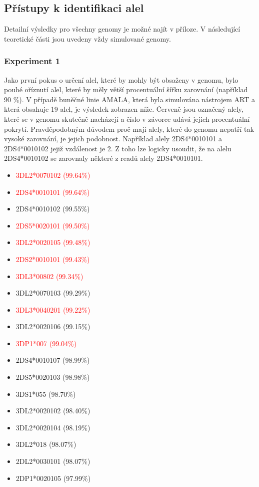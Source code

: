 \documentclass[czech,DP]{thesiskiv}
\numberwithin{equation}{section}
\begin{document}
\subsection{Přístupy k identifikaci alel}
Detailní výsledky pro všechny genomy je možné najít v příloze. V následující teoretické části jsou uvedeny vždy simulované genomy.

\subsubsection{Experiment 1}
Jako první pokus o určení alel, které by mohly být obsaženy v genomu, bylo pouhé oříznutí alel, které by měly větší procentuální šířku zarovnání (například 90 \%).  V případě buněčné linie AMALA, která byla simulována nástrojem ART a která obsahuje 19 alel, je výsledek zobrazen níže. Červeně jsou označený alely, které se v genomu skutečně nacházejí a číslo v závorce udává jejich procentuální pokrytí. Pravděpodobným důvodem proč mají alely, které do genomu nepatří tak vysoké zarovnání, je jejich podobnost. Například alely 2DS4*0010101 a 2DS4*0010102 jejiž vzdálenost je 2. Z toho lze logicky usoudit, že na alelu 2DS4*0010102 se zarovnaly některé z readů alely 2DS4*0010101.

\begin{multicols}{2}
\begin{itemize}
	\itemsep0em
	\item \textcolor{red}{3DL2*0070102 (99.64\%) }
	\item \textcolor{red}{2DS4*0010101 (99.64\%) }
	\item 2DS4*0010102 (99.55\%)
	\item \textcolor{red}{2DS5*0020101 (99.50\%) }
	\item \textcolor{red}{3DL2*0020105 (99.48\%) }
	\item \textcolor{red}{2DS2*0010101 (99.43\%) }
	\item \textcolor{red}{3DL3*00802 (99.34\%) }
	\item 3DL2*0070103 (99.29\%) 
	\item \textcolor{red}{3DL3*0040201 (99.22\%) }
	\item 3DL2*0020106 (99.15\%)
	\item \textcolor{red}{3DP1*007 (99.04\%) }
	\item 2DS4*0010107 (98.99\%)
	\item 2DS5*0020103 (98.98\%)
	\item 3DS1*055 (98.70\%)
	\item 3DL2*0020102 (98.40\%)
	\item 3DL2*0020104 (98.19\%)
	\item 3DL2*018 (98.07\%)
	\item 2DL2*0030101 (98.07\%)
	\item 2DP1*0020105 (97.99\%)
\end{itemize}
\end{multicols}
\end{document}
